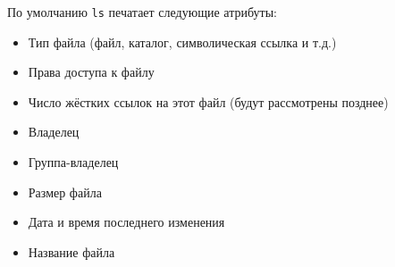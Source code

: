 \documentclass[handout]{beamer}
\begin{document}
\begin{frame}[fragile]
	По умолчанию \texttt{ls} печатает следующие атрибуты:\pause
	\begin{itemize}
		\item{Тип файла (файл, каталог, символическая ссылка и т.д.)}\pause
		\item{Права доступа к файлу}\pause
		\item{Число жёстких ссылок на этот файл (будут рассмотрены позднее)}\pause
		\item{Владелец}\pause
		\item{Группа-владелец}\pause
		\item{Размер файла}\pause
		\item{Дата и время последнего изменения}\pause
		\item{Название файла}\pause[0]
	\end{itemize}
	

\end{frame}
\end{document}

